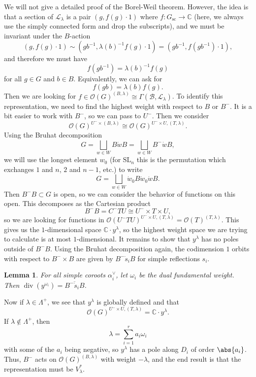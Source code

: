 \documentclass{amsart}
\newtheorem{lem}[thm]{Lemma}
\theoremstyle{definition}
\theoremstyle{remark}
\theoremstyle{plain}
\theoremstyle{definition}
\theoremstyle{remark}
\newcommand{\C}{\mathbb{C}}
\newcommand{\mc}[1]{\mathcal{#1}}
\newcommand{\mr}[1]{\mathrm{#1}}
\newcommand{\on}[1]{\operatorname{#1}}
\newcommand{\ol}[1]{\overline{#1}}
\newcommand{\1}{\mathbf{1}}
\newcommand{\2}{\mathbf{2}}
\newcommand{\3}{\mathbf{3}}
\newcommand{\SL}{\mr{SL}}
\begin{document}
We will not give a detailed proof of the Borel-Weil theorem. However, the idea is that a section of \(\mc{L}_{\lambda}\) is a pair \((g, f(g) \cdot 1)\) where \(f \colon G_{\on{sc}} \to \C\) (here, we always use the simply connected form and drop the subscripts), and we must be invariant under the \(B\)-action
\[ (g, f(g) \cdot 1) \sim (g b^{-1}, \lambda(b)^{-1} f(g) \cdot 1) = (gb^{-1}, f(gb^{-1}) \cdot 1), \]
and therefore we must have
\[ f(gb^{-1}) = \lambda(b)^{-1} f(g) \]
for all \(g \in G\) and \(b \in B\). Equivalently, we can ask for
\[ f(gb) = \lambda(b) f(g). \]
Then we are looking for \(f \in \mc{O}(G)^{(B, \lambda)} \cong \Gamma(\mc{B}, \mc{L}_{\lambda})\). To identify this representation, we need to find the highest weight with respect to \(B\) or \(B^-\). It is a bit easier to work with \(B^-\), so we can pass to \(U^-\). Then we consider
\[ \mc{O}(G)^{U^- \times (B, \lambda)} \cong \mc{O}(G)^{U^- \times U, (T, \lambda)}. \]
Using the Bruhat decomposition
\[ G = \bigsqcup_{w \in W} B \dot{w} B = \bigsqcup_{w \in W} B^- \dot{w} B, \]
we will use the longest element \(w_0\) (for \(\SL_n\) this is the permutation which exchanges \(1\) and \(n\), \(2\) and \(n-1\), etc.) to write
\[ G = \bigsqcup_{w \in W} \dot{w}_0 B \dot{w}_0 \dot{w} B. \]
Then \(B^- B \subset G\) is open, so we can consider the behavior of functions on this open. This decomposes as the Cartesian product
\[ B^- B = C^- T U \cong U^- \times T \times U, \]
so we are looking for functions in \(\mc{O}(U^- T U)^{U^- \times U, (T, \lambda)} = \mc{O}(T)^{(T, \lambda)}\). This gives us the \(1\)-dimensional space \(\C \cdot y^{\lambda}\), so the highest weight space we are trying to calculate is at most \(1\)-dimensional. It remains to show that \(y^{\lambda}\) has no poles outside of \(B^- B\). Using the Bruhat decomposition again, the codimension \(1\) orbits with respect to \(B^- \times B\) are given by \(B^- \dot{s}_i B\) for simple reflections \(s_i\). 

\begin{lem}
    For all simple coroots \(\alpha_i^{\vee}\), let \(\omega_i\) be the dual fundamental weight. Then \(\on{div}(y^{\omega_i}) = \ol{B^- \dot{s}_i B}\).
\end{lem}

Now if \(\lambda \in \Lambda^+\), we see that \(y^{\lambda}\) is globally defined and that
\[ \mc{O}(G)^{U^- \times U, (T, \lambda)} = \C \cdot y^{\lambda}. \]
If \(\lambda \notin \Lambda^+\), then
\[ \lambda = \sum_{i=1}^r a_i \omega_i \]
with some of the \(a_i\) being negative, so \(y^{\lambda}\) has a pole along \(D_i\) of order \(\abs{a_i}\). Thus, \(B^-\) acts on \(\mc{O}(G)^{(B, \lambda)}\) with weight \(-\lambda\), and the end result is that the representation must be \(V_{\lambda}^*\).
\end{document}
